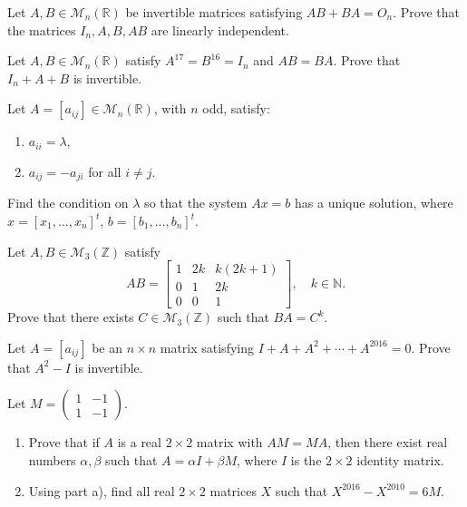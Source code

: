 \documentclass[12pt]{article}
\begin{document}
\begin{problem}
Let $A,B \in \mathcal{M}_n(\mathbb{R})$ be invertible matrices satisfying $AB+BA = O_n$. Prove that the matrices $I_n, A, B, AB$ are linearly independent.
\end{problem}

\begin{problem}
Let $A,B \in \mathcal{M}_n(\mathbb{R})$ satisfy $A^{17}=B^{16}=I_n$ and $AB=BA$. Prove that $I_n+A+B$ is invertible.
\end{problem}

\begin{problem}
Let $A=[a_{ij}] \in \mathcal{M}_n(\mathbb{R})$, with $n$ odd, satisfy:
\begin{enumerate}[label=\alph*)]
\item $a_{ii}=\lambda$,
\item $a_{ij}=-a_{ji}$ for all $i\neq j$.
\end{enumerate}
Find the condition on $\lambda$ so that the system $Ax=b$ has a unique solution, where $x=[x_1,\dots,x_n]^t$, $b=[b_1,\dots,b_n]^t$.
\end{problem}

\begin{problem}
Let $A,B \in \mathcal{M}_3(\mathbb{Z})$ satisfy
\[ AB = \begin{bmatrix} 1 & 2k & k(2k+1) \\ 0 & 1 & 2k \\ 0 & 0 & 1 \end{bmatrix},\quad k \in \mathbb{N}. \]
Prove that there exists $C \in \mathcal{M}_3(\mathbb{Z})$ such that $BA = C^k$.
\end{problem}

\begin{problem}
Let $A=[a_{ij}]$ be an $n\times n$ matrix satisfying $I+A+A^2+\cdots+A^{2016}=0$. Prove that $A^2-I$ is invertible.
\end{problem}

\begin{problem}
Let $M = \begin{pmatrix}1 & -1\\ 1& -1\end{pmatrix}$.
\begin{enumerate}[label=\alph*)]
\item Prove that if $A$ is a real $2\times2$ matrix with $AM=MA$, then there exist real numbers $\alpha,\beta$ such that $A=\alpha I+\beta M$, where $I$ is the $2\times2$ identity matrix.
\item Using part a), find all real $2\times 2$ matrices $X$ such that $X^{2016}-X^{2010}=6M$.
\end{enumerate}
\end{problem}
\end{document}
